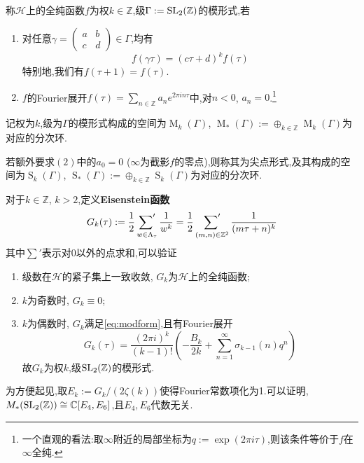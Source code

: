 \begin{defn}
	称$\mathcal{H}$上的全纯函数$f$为权$k \in \mathbb{Z}$,级$\Gamma:= \operatorname{SL}_2(\mathbb{Z})$的模形式,若
	
	\begin{enumerate}[(1)]
		\item 对任意$\gamma=\begin{pmatrix}
		a & b\\
		c & d
		\end{pmatrix}\in \Gamma$,均有
		\begin{equation}\label{eq:modform}
		f(\gamma \tau)=(c \tau +d)^k f(\tau)
		\end{equation}
		特别地,我们有$f(\tau+1)=f(\tau)$.
		\item $f$的Fourier展开$f(\tau)=\sum_{n \in \mathbb{Z}}a_ne^{2\pi i n \tau}$中,对$n < 0$, $a_n =0$.\footnote{一个直观的看法:取$\infty$附近的局部坐标为$q:=\exp(2\pi i \tau)$,则该条件等价于$f$在$\infty$全纯.}
	\end{enumerate}
	记权为$k$,级为$\Gamma$的模形式构成的空间为$\operatorname{M}_k(\Gamma)$, $\operatorname{M}_{*}(\Gamma):= \oplus_{k \in \mathbb{Z}}\operatorname{M}_k(\Gamma)$为对应的分次环.
	
	若额外要求$(2)$中的$a_0=0$ ($\infty$为截影$f$的零点),则称其为尖点形式,及其构成的空间为$\operatorname{S}_k(\Gamma)$, $\operatorname{S}_{*}(\Gamma):= \oplus_{k \in \mathbb{Z}}\operatorname{S}_k(\Gamma)$为对应的分次环.
\end{defn}

\begin{exercise}
	对于$k \in \mathbb{Z}$, $k>2$,定义\textbf{Eisenstein函数}
	$$G_k(\tau):= \frac{1}{2}\mathop{\mathord{\sum}'}_{w \in \Lambda_{\tau}} \frac{1}{w^k}=\frac{1}{2} \mathop{\mathord{\sum}'}_{(m,n) \in \mathbb{Z}^2} \frac{1}{(m\tau +n)^k}$$
	其中$\sum'$表示对0以外的点求和,可以验证
	\begin{enumerate}
		\item 级数在$\mathcal{H}$的紧子集上一致收敛, $G_k$为$\mathcal{H}$上的全纯函数;
		\item $k$为奇数时, $G_k \equiv 0$;
		\item $k$为偶数时, $G_k$满足\eqref{eq:modform},且有Fourier展开
		$$G_k(\tau)=\frac{(2\pi i)^k}{(k-1)!} \left( -\frac{B_k}{2k}+\sum_{n=1}^{\infty}\sigma_{k-1}(n)q^n \right)$$
		故$G_k$为权$k$,级$\operatorname{SL}_2(\mathbb{Z})$的模形式.
	\end{enumerate}
\end{exercise}

为方便起见,取$E_k:= G_k/(2\zeta(k))$使得Fourier常数项化为1.可以证明, $M_{*}(\operatorname{SL}_2(\mathbb{Z})) \cong \mathbb{C}[E_4,E_6]$,且$E_4,E_6$代数无关.

